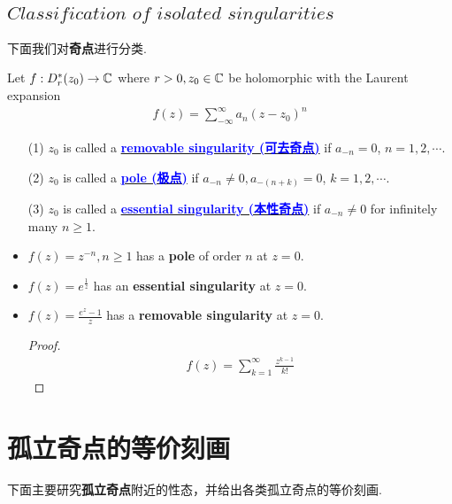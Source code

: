 \subsection{$Classification \,\, of \,\, isolated \,\, singularities$}
	下面我们对\textbf{奇点}进行分类.
	\begin{defn}\label{def 8.2.2}
		Let $f : D_{r}^{*}(z_0) \rightarrow \mathbb{C}$ where $r > 0 , z_0 \in \mathbb{C}$ be holomorphic with the Laurent expansion
		\begin{align}
			f(z) = \sum_{-\infty}^{\infty}{a_n (z - z_0)^n}
		\end{align}
		\begin{enumerate}
			\item[(1)]$z_0$ is called a \underline{\textcolor{blue}{\textbf{removable singularity (可去奇点)}}} if $a_{-n} = 0$, $n = 1 , 2 , \cdots$.
			
			\item[(2)]$z_0$ is called a \underline{\textcolor{blue}{\textbf{pole (极点)}}} if $a_{-n} \neq 0 , a_{-(n + k)} = 0$, $k = 1 , 2 , \cdots$.
			
			\item[(3)]$z_0$ is called a \underline{\textcolor{blue}{\textbf{essential singularity (本性奇点)}}} if $a_{-n} \neq 0$ for infinitely many $n \geq 1$.
		\end{enumerate}
	
		\vspace{2em}
		\begin{example}\label{ex 8.2.2}
			\begin{itemize}
				\item $f(z) = z^{-n} , n \geq 1$ has a \textbf{pole} of order $n$ at $z = 0$.
				
				\item $f(z) = e^{\frac{1}{z}}$ has an \textbf{essential singularity} at $z = 0$.
				
				\item $f(z) = \frac{e^z - 1}{z}$ has a \textbf{removable singularity} at $z = 0$.
				\begin{proof}
					\begin{align}
						f(z) = \sum_{k = 1}^{\infty}{\frac{z^{k - 1}}{k!}}
					\end{align}
				\end{proof}
			\end{itemize}
		\end{example}
	\end{defn}

\newpage
\section{孤立奇点的等价刻画}
	\begin{center}
		下面主要研究\textbf{孤立奇点}附近的性态，并给出各类孤立奇点的等价刻画.
	\end{center}

